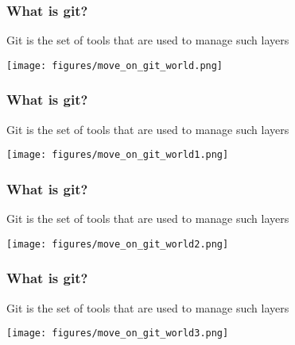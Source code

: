 \documentclass[xcolor=dvipsnames,10pt]{beamer}
\begin{document}
\begin{frame}
 \frametitle{What is git?}
 
 Git is the set of tools that are used to manage such layers
  \vspace*{0.4cm}
 
 \begin{center}
 \texttt{[image: figures/move\_on\_git\_world.png]}
 \end{center}
 
\end{frame}
\addtocounter{framenumber}{-1}
\begin{frame}
 \frametitle{What is git?}
 
 Git is the set of tools that are used to manage such layers
  \vspace*{0.4cm}
 
 \begin{center}
 \texttt{[image: figures/move\_on\_git\_world1.png]}
 \end{center}
 
\end{frame}
\addtocounter{framenumber}{-1}
\begin{frame}
 \frametitle{What is git?}
 
 Git is the set of tools that are used to manage such layers
  \vspace*{0.4cm}
 
 \begin{center}
 \texttt{[image: figures/move\_on\_git\_world2.png]}
 \end{center}
 
\end{frame}
\addtocounter{framenumber}{-1}
\begin{frame}
 \frametitle{What is git?}
 
 Git is the set of tools that are used to manage such layers
  \vspace*{0.4cm}
 
 \begin{center}
 \texttt{[image: figures/move\_on\_git\_world3.png]}
 \end{center}
 
\end{frame}
\end{document}
